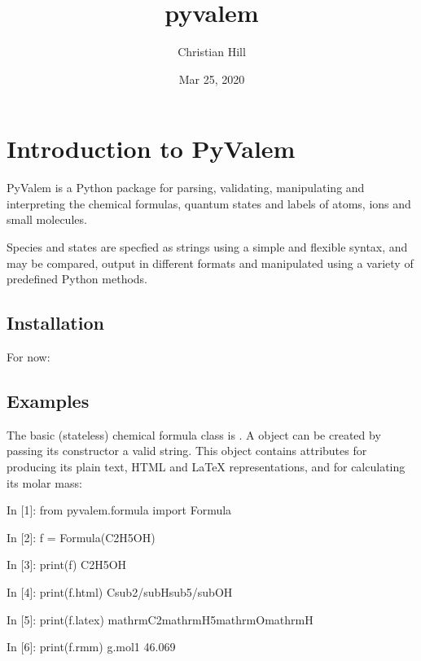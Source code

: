 \documentclass[letterpaper,10pt,english]{sphinxmanual}
\title{pyvalem}
\date{Mar 25, 2020}
\author{Christian Hill}
\begin{document}
\pagestyle{empty}
\sphinxmaketitle
\pagestyle{plain}
\sphinxtableofcontents
\pagestyle{normal}
\label{\detokenize{index::doc}}



\chapter{Introduction to PyValem}
\label{\detokenize{introduction:introduction-to-pyvalem}}\label{\detokenize{introduction::doc}}
PyValem is a Python package for parsing, validating, manipulating and
interpreting the chemical formulas, quantum states and labels of atoms, ions
and small molecules.

Species and states are specfied as strings using a simple and flexible syntax,
and may be compared, output in different formats and manipulated using a
variety of predefined Python methods.


\section{Installation}
\label{\detokenize{introduction:installation}}
For now:

\begin{sphinxVerbatim}[commandchars=\\\{\}]
  
\end{sphinxVerbatim}


\section{Examples}
\label{\detokenize{introduction:examples}}
The basic (state\sphinxhyphen{}less) chemical formula class is . A  object
can be created by passing its constructor a valid string. This object contains
attributes for producing its plain text, HTML and LaTeX representations, and
for calculating its molar mass:

\begin{sphinxVerbatim}[commandchars=\\\{\}]
In [1]: from pyvalem.formula import Formula

In [2]: f = Formula(\PYGZsq{}C2H5OH\PYGZsq{})

In [3]: print(f)
C2H5OH

In [4]: print(f.html)
C\PYGZlt{}sub\PYGZgt{}2\PYGZlt{}/sub\PYGZgt{}H\PYGZlt{}sub\PYGZgt{}5\PYGZlt{}/sub\PYGZgt{}OH

In [5]: print(f.latex)
\PYGZdl{}\PYGZbs{}mathrm\PYGZob{}C\PYGZcb{}\PYGZus{}\PYGZob{}2\PYGZcb{}\PYGZbs{}mathrm\PYGZob{}H\PYGZcb{}\PYGZus{}\PYGZob{}5\PYGZcb{}\PYGZbs{}mathrm\PYGZob{}O\PYGZcb{}\PYGZbs{}mathrm\PYGZob{}H\PYGZcb{}\PYGZdl{}

In [6]: print(f.rmm)    \PYGZsh{} g.mol\PYGZhy{}1
46.069
\end{sphinxVerbatim}
\end{document}
